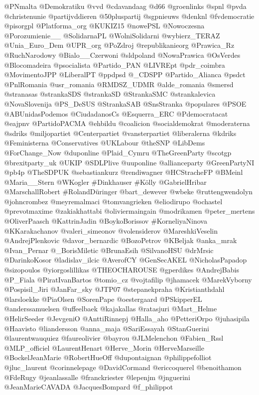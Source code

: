 \begin{multicols}{3}
{@PNmalta
@Demokratiku
@vvd
@cdavandaag
@d66
@groenlinks
@spnl
@pvda
@christenunie
@partijvddieren
@50pluspartij
@sgpnieuws
@denknl
@fvdemocratie
@pisorgpl
@Platforma\_org
@KUKIZ15
@nowePSL
@Nowoczesna
@Porozumienie\_\_
@SolidarnaPL
@WolniSolidarni
@wybierz\_TERAZ
@Unia\_Euro\_Dem
@UPR\_org
@PoZdroj
@republikanieorg
@Prawica\_Rz
@RuchNarodowy
@Bialo\_\_Czerwoni
@sldpoland
@NowaPrawica
@OsVerdes
@Blocomadeira
@psocialista
@Partido\_PAN
@LIVREpt
@pdr\_coimbra
@MovimentoJPP
@LiberalPT
@ppdpsd
@\_CDSPP
@Partido\_Alianca
@psdct
@PnlRomania
@usr\_romania
@RMDSZ\_UDMR
@alde\_romania
@smersd
@stranasas
@strankaSDS
@strankaSD
@StrankaSMC
@strankalevica
@NovaSlovenija
@PS\_DeSUS
@StrankaSAB
@SnsStranka
@populares
@PSOE
@ABUnidasPodemos
@CiudadanosCs
@Esquerra\_ERC
@Pdemocratacat
@eajpnv
@PartidoPACMA
@ehbildu
@coalicion
@socialdemokrat
@moderaterna
@sdriks
@miljopartiet
@Centerpartiet
@vansterpartiet
@liberalerna
@kdriks
@Feministerna
@Conservatives
@UKLabour
@theSNP
@LibDems
@ForChange\_Now
@duponline
@Plaid\_Cymru
@TheGreenParty
@scotgp
@brexitparty\_uk
@UKIP
@SDLPlive
@uuponline
@allianceparty
@GreenPartyNI
@pb4p
@TheSDPUK
@sebastiankurz
@rendiwagner
@HCStracheFP
@BMeinl
@Maria\_\_Stern
@WKogler
\#Dinkhauser
\#Kölly
@GabrielHribar
@MarschallRobert
\#RolandDüringer
@bart\_dewever
@wbeke
@ruttengwendolyn
@johncrombez
@meyremalmaci
@tomvangrieken
@eliodirupo
@ochastel
@prevotmaxime
@zakiakhattabi
@oliviermaingain
@modrikamen
@peter\_mertens
@OliverPaasch
@KattrinJadin
@BoykoBorissov
\#KorneliyaNinova
@KKarakachanov
@valeri\_simeonov
@volensiderov
@MareshkiVeselin
@AndrejPlenkovic
@davor\_bernardic
@BozoPetrov
@KBeljak
@anka\_mrak
@Ivan\_Pernar
@\_BorisMiletic
@BrunaEsih
@SilvanoHSU
@drMrsic
@DarinkoKosor
@ladislav\_ilcic
@AverofCY
@GenSecAKEL
@NicholasPapadop
@sizopoulos
@yiorgoslillikas
@THEOCHAROUSE
@gperdikes
@AndrejBabis
@P\_Fiala
@PiratIvanBartos
@tomio\_cz
@vojtafilip
@jhamacek
@MarekVyborny
@Pospisil\_Jiri
@JanFar\_sky
@JTP07
@stepanekpraha
@Kristianthdahl
@larsloekke
@PiaOlsen
@SorenPape
@oestergaard
@PSkipperEL
@anderssamuelsen
@uffeelbaek
@kajakallas
@ratasjuri
@Mart\_Helme
@HelirSeeder
@JevgeniO
@AnttiRinnepj
@Halla\_aho
@PetteriOrpo
@juhasipila
@Haavisto
@liandersson
@anna\_maja
@SariEssayah
@StanGuerini
@laurentwauquiez
@faureolivier
@bayrou
@JLMelenchon
@Fabien\_Rssl
@MLP\_officiel
@LaurentHenart
@Herve\_Morin
@HerveMarseille
@BockelJeanMarie
@RobertHueOff
@dupontaignan
@philippefolliot
@jluc\_laurent
@corinnelepage
@DavidCormand
@ericcoquerel
@benoithamon
@FdeRugy
@jeanlassalle
@franckriester
@lepenjm
@jnguerini
@JeanMarieCAVADA
@JacquesBompard
@f\_philippot
}
\end{multicols}
